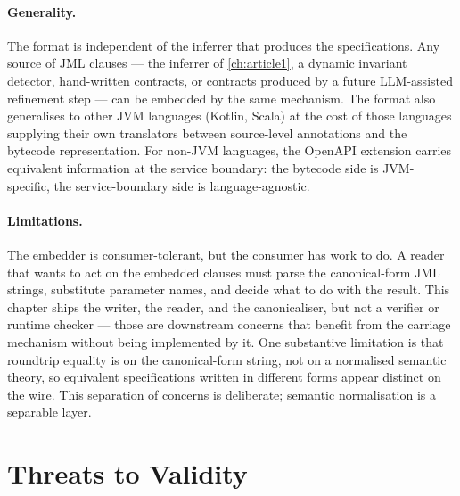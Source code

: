 \paragraph{Generality.}
The format is independent of the inferrer that produces the specifications. Any
source of JML clauses --- the inferrer of \cref{ch:article1}, a dynamic invariant
detector, hand-written contracts, or contracts produced by a future
LLM-assisted refinement step --- can be embedded by the same mechanism. The
format also generalises to other JVM languages (Kotlin, Scala) at the cost of
those languages supplying their own translators between source-level annotations
and the bytecode representation. For non-JVM languages, the OpenAPI extension
carries equivalent information at the service boundary: the bytecode side is
JVM-specific, the service-boundary side is language-agnostic.

\paragraph{Limitations.}
The embedder is consumer-tolerant, but the consumer has work to do. A reader that
wants to act on the embedded clauses must parse the canonical-form JML strings,
substitute parameter names, and decide what to do with the result. This chapter
ships the writer, the reader, and the canonicaliser, but not a verifier or
runtime checker --- those are downstream concerns that benefit from the carriage
mechanism without being implemented by it. One substantive limitation is that
roundtrip equality is on the canonical-form string, not on a normalised semantic
theory, so equivalent specifications written in different forms appear distinct
on the wire. This separation of concerns is deliberate; semantic normalisation is
a separable layer.

\section{Threats to Validity}
\label{sec:a2-threats}

